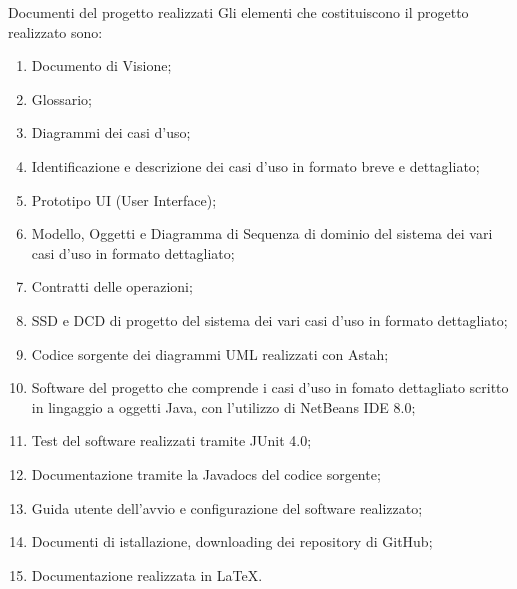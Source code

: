  \begin{frame} [allowframebreaks] {Documenti del progetto realizzati }
   Gli elementi che costituiscono il progetto realizzato sono:
   \begin{enumerate} 
     \item Documento di Visione;
     \item Glossario;
     \item Diagrammi dei casi d'uso;
     \item Identificazione e descrizione dei casi d'uso in formato breve e dettagliato;
     \item Prototipo UI (User Interface);
     \item Modello, Oggetti e Diagramma di Sequenza di dominio del sistema dei vari casi d'uso in formato dettagliato;
     \item Contratti delle operazioni;
     \item SSD e DCD di progetto del sistema dei vari casi d'uso in formato dettagliato;
     \item Codice sorgente dei diagrammi UML realizzati con Astah;
     \item Software del progetto che comprende i casi d'uso in fomato dettagliato scritto in lingaggio a oggetti Java, 
           con l'utilizzo di NetBeans IDE 8.0;
     \item Test del software realizzati tramite JUnit 4.0; 
     \item Documentazione tramite la Javadocs del codice sorgente; 
     \item Guida utente dell'avvio e configurazione del software realizzato;
     \item Documenti di istallazione, downloading dei repository di GitHub;
     \item Documentazione realizzata in \LaTeX.
   \end{enumerate}
 \end{frame}
